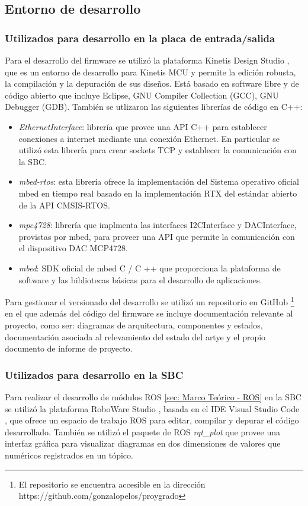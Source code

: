 \documentclass[withindex,glossary]{cam-thesis}
\begin{document}
\subsection{Entorno de desarrollo}
\subsubsection{Utilizados para desarrollo en la placa de entrada/salida}
Para el desarrollo del firmware se utilizó la plataforma Kinetis Design Studio \cite{KDS}, que es un entorno de desarrollo para Kinetis MCU y permite la edición robusta, la compilación y la depuración de sus diseños. Está basado en software libre y de código abierto que incluye Eclipse, GNU Compiler Collection (GCC), GNU Debugger (GDB).
También se utlizaron las siguientes librerías de código en C++:
\begin{itemize}
	\item \textit{EthernetInterface}: librería \cite{EthernetInterface} que provee una API C++ para establecer conexiones a internet mediante una conexión Ethernet. En particular se utilizó esta librería para crear sockets TCP y establecer la comunicación con la SBC.
	\item \textit{mbed-rtos}: esta librería \cite{mbed-rtos} ofrece la implementación del Sistema operativo oficial mbed en tiempo real basado en la implementación RTX del estándar abierto de la API CMSIS-RTOS.
	\item \textit{mpc4728}: librería \cite{MCP4728} que implmenta las interfaces I2CInterface y DACInterface, provistas por mbed, para proveer una API que permite la comunicación con el dispositivo DAC MCP4728.
	\item \textit{mbed}: SDK oficial de mbed C / C ++ \cite{mbed}  que proporciona la plataforma de software y las bibliotecas básicas para el desarrollo de aplicaciones.
\end{itemize}
Para gestionar el versionado del desarrollo se utilizó un repositorio en GitHub \footnote{El repositorio se encuentra accesible en la dirección https://github.com/gonzalopelos/proygrado} en el que además del código del firmware se incluye documentación relevante al proyecto, como ser: diagramas de arquitectura, componentes y estados, documentación asociada al relevamiento del estado del artye y el propio documento de informe de proyecto.
\subsubsection{Utilizados para desarrollo en la SBC}
Para realizar el desarrollo de módulos ROS \ref{sec: Marco Teórico - ROS} en la SBC se utilizó la plataforma RoboWare Studio \cite{RoboWare}, basada en el IDE Visual Studio Code \cite{vscode}, que ofrece un espacio de trabajo ROS para editar, compilar y depurar el código desarrollado.
También se utilizó el paquete de ROS \textit{rqt\_plot} \cite{rqt-plot} que provee una interfaz gráfica para visualizar diagramas en dos dimensiones de valores que numéricos registrados en un tópico.
\end{document}
